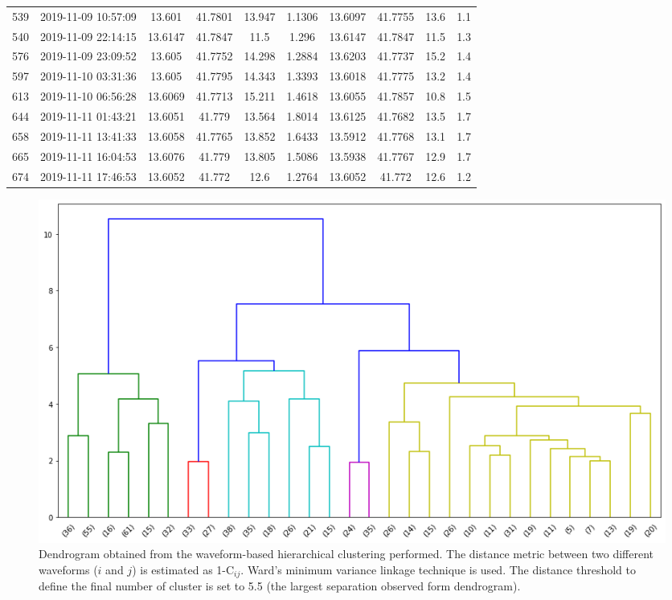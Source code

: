 \documentclass[a4paper,12pt]{article}
\begin{document}
\begin{landscape}
\begin{table}
\begin{center}
\begin{tabular}{@{} c c c c c c c c c c}
539 & 2019-11-09 10:57:09 & 13.601 & 41.7801 & 13.947 & 1.1306 & 13.6097 & 41.7755 & 13.6 & 1.1 \\
540 & 2019-11-09 22:14:15 & 13.6147 & 41.7847 & 11.5 & 1.296 & 13.6147 & 41.7847 & 11.5 & 1.3 \\
576 & 2019-11-09 23:09:52 & 13.605 & 41.7752 & 14.298 & 1.2884 & 13.6203 & 41.7737 & 15.2 & 1.4 \\
597 & 2019-11-10 03:31:36 & 13.605 & 41.7795 & 14.343 & 1.3393 & 13.6018 & 41.7775 & 13.2 & 1.4 \\
613 & 2019-11-10 06:56:28 & 13.6069 & 41.7713 & 15.211 & 1.4618 & 13.6055 & 41.7857 & 10.8 & 1.5 \\
644 & 2019-11-11 01:43:21 & 13.6051 & 41.779 & 13.564 & 1.8014 & 13.6125 & 41.7682 & 13.5 & 1.7 \\
658 & 2019-11-11 13:41:33 & 13.6058 & 41.7765 & 13.852 & 1.6433 & 13.5912 & 41.7768 & 13.1 & 1.7 \\
665 & 2019-11-11 16:04:53 & 13.6076 & 41.779 & 13.805 & 1.5086 & 13.5938 & 41.7767 & 12.9 & 1.7 \\
674 & 2019-11-11 17:46:53 & 13.6052 & 41.772 & 12.6 & 1.2764 & 13.6052 & 41.772 & 12.6 & 1.2 \\
    \end{tabular}
 \label{tab:velocitymodel}
\end{center}
\end{table}

\end{landscape}


\begin{figure}
\renewcommand{\thefigure}{S\arabic{figure}}
\begin{center}
 \noindent\includegraphics[width=1\linewidth]{dendrogram_balsorano.png} 
\end{center}
\caption{Dendrogram obtained from the waveform-based hierarchical clustering performed. The distance metric between two different waveforms ($i$ and $j$) is estimated as 1-C$_{ij}$. Ward's minimum variance linkage technique is used. The distance threshold to define the final number of cluster is set to 5.5 (the largest separation observed form dendrogram).}
\label{fig:dendrogram}
\end{figure}
\end{document}
